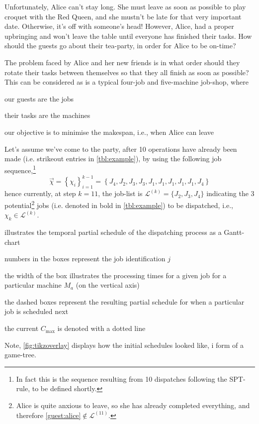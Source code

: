 

Unfortunately, Alice can't stay long. She must leave as soon as possible to 
play croquet with the Red Queen, 
and she mustn't be late for that very important date. Otherwise, it's off with 
someone's head! However, Alice, had a proper upbringing and won't leave the 
table until everyone has finished their tasks. 
How should the guests go about their tea-party, in order for Alice to be 
on-time?

The problem faced by Alice and her new friends is in what order should they 
rotate their tasks between themselves so that they all finish as soon as 
possible? This can be considered as is a typical four-job and five-machine 
job-shop, where
\begin{enumerate*}[label={{}}]
    \item our guests are the jobs
    \item their tasks are the machines
    \item our objective is to minimise the makespan, i.e., when Alice can leave
\end{enumerate*}

Let's assume we've come to the party, after 10 operations have already been 
made (i.e. strikeout entries in \cref{tbl:example}), by using the following 
job sequence,\footnote{In fact this is the sequence resulting from 10 
    dispatches following the SPT-rule, to be defined shortly.}
\begin{equation}
\vec{\chi} = \left\{ \chi_i \right\}_{i=1}^{k-1}
           = \left\{ J_4,J_2,J_3,J_3,J_1,J_1,J_1,J_1,J_1,J_4 \right\}
\end{equation}
hence currently, at step $k=11$, the job-list is 
$\mathcal{L}^{(k)}=\{J_2,J_3,J_4\}$ indicating the 3 potential\footnote{
    Alice is quite anxious to leave, so she has already completed everything, 
    and therefore \ref{guest:alice}$\notin\mathcal{L}^{(11)}$.} 
jobs (i.e. denoted in bold in \cref{tbl:example}) to be dispatched, i.e., 
$\chi_k\in\mathcal{L}^{(k)}$.

 illustrates the temporal partial schedule of the 
dispatching process as a Gantt-chart
\begin{enumerate*}
    \item numbers in the boxes represent the job identification $j$
    \item the width of the box illustrates the processing times for a given job 
    for a particular machine $M_a$ (on the vertical axis)
    \item the dashed boxes represent the resulting partial schedule for when a 
    particular job is scheduled next 
    \item the current $C_{\max}$ is denoted with a dotted line    
\end{enumerate*}
Note, \cref{fig:tikzoverlay} displays how the initial schedules looked like, i 
form of a game-tree.

